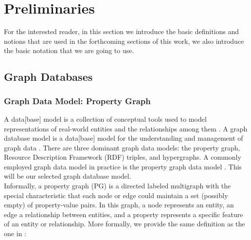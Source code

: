\newpage
\section{Preliminaries}
\label{sec:prelim}

For the interested reader, in this section we introduce the basic definitions and notions that are used
in the forthcoming sections of this work, we also introduce the basic notation that we are going to use.

\subsection{Graph Databases}

\subsubsection*{Graph Data Model: Property Graph}\label{prelim:graphdatamodel-pg}

A data[base] model is a collection of conceptual tools used to model representations of real-world entities and the relationships among them \cite{GDB-angles2008survey}. A graph database model is a data[base] model for the understanding and management of graph data \cite{GDB-kumar2015graph}. There are three dominant graph data models: the property graph, Resource Description Framework (RDF) triples, and hypergraphs. A commonly employed graph data model in practice is the property graph data model \cite{Graph-Databases-OReally-book, PG-angles2017foundations}. This will be our selected graph database model.\\

Informally, a property graph (PG) is a directed labeled multigraph with the special characteristic that each node or edge could maintain a set (possibly empty) of property-value pairs. In this graph, a node represents an entity, an edge a relationship between entities, and a property represents a specific feature of an entity or relationship. More formally, we provide the same definition as the one in \cite{angles2018propertyGraphDatabaseModel}:

